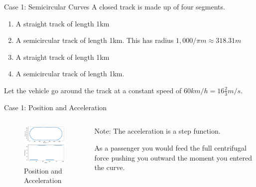 \documentclass{beamer}
\begin{document}
\begin{frame}{Case 1: Semicircular Curves}
	A closed  track is made up of four segments.
	\begin{enumerate}
		\item A straight track of length 1km
		\item A semicircular track of length 1km. This has radius $1,000 / \pi m \approx 318.31m$
		\item A straight track of length 1km
		\item A semicircular track of length 1km.
	\end{enumerate}
	Let the vehicle go around the track at a constant speed of $60 km/h = 16 \frac{2}{3} m/s$.
\end{frame}

\begin{frame}{Case 1: Position and Acceleration}
	\begin{columns}
		\begin{column}{0.8\textwidth}			
			\begin{figure}
				\caption{Position and Acceleration}
				\centering
				\includegraphics[width=70mm, scale=0.2]{circular_track.png}
			\end{figure}
		\end{column}
		\begin{column}{0.33\textwidth}
			Note: The acceleration is a step function. 
			
			
			As a passenger you would feed the full centrifugal force pushing you outward the moment you entered the curve.			
		\end{column}
	\end{columns}
\end{frame}
\end{document}

